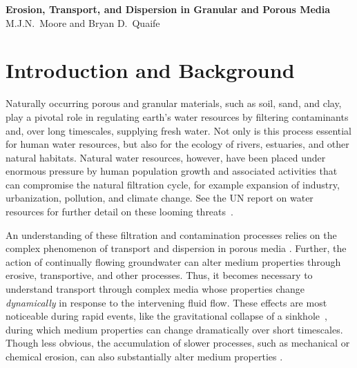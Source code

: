 \documentclass[11pt]{article}
\begin{document}
\begin{center}
{\large \bf Erosion, Transport, and Dispersion in Granular
and Porous Media} 
\\
M.J.N.~Moore and Bryan D.~Quaife
\end{center}


\section{Introduction and Background}
Naturally occurring porous and granular materials, such as soil, sand, and clay, play a pivotal role in regulating earth's water resources by filtering contaminants and, over long timescales, supplying fresh water.  Not only is this process essential for human water resources, but also for the ecology of rivers, estuaries, and other natural habitats.  Natural water resources, however, have been placed under enormous pressure by human population growth and associated activities that can compromise the natural filtration cycle, for example expansion of industry, urbanization, pollution, and climate change. See the UN report on water resources for further detail on these looming threats~\cite{UNwater}.

An understanding of these filtration and contamination processes relies
on the complex phenomenon of transport and dispersion in porous media
\cite{scheidegger1961general, neuman1987stochastic,
delgado2007longitudinal, zhang2016backward}. Further, the action of
continually flowing groundwater can alter medium properties through
erosive, transportive, and other processes. Thus, it becomes necessary
to understand transport through complex media whose properties change
{\em dynamically} in response to the intervening fluid flow. These
effects are most noticeable during rapid events, like the gravitational
collapse of a sinkhole~\cite{sandhu2018fate}, during which medium
properties can change dramatically over short timescales. Though less
obvious, the accumulation of slower processes, such as mechanical or chemical erosion, can also substantially alter medium properties \cite{szymczak2009wormhole, ellis2013dissolution}.  
\end{document}
